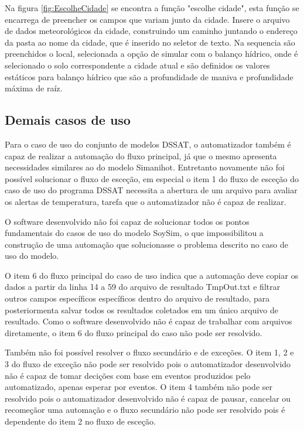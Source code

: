 \documentclass[tg]{mdtufsm}
\begin{document}
                    Na figura \ref{fig:EscolheCidade} se encontra a função "escolhe cidade", esta função se encarrega de preencher os campos que variam junto da cidade. Insere o arquivo de dados meteorológicos da cidade, construindo um caminho juntando o endereço da pasta ao nome da cidade, que é inserido no seletor de texto. Na sequencia são preenchidos o local, selecionada a opção de simular com o balanço hídrico, onde é selecionado o solo correspondente a cidade atual e são definidos os valores estáticos para balanço hídrico que são a profundidade de maniva e profundidade máxima de raíz.

                \subsection{Demais casos de uso}

                    Para o caso de uso do conjunto de modelos DSSAT, o automatizador também é capaz de realizar a automação do fluxo principal, já que o mesmo apresenta necessidades similares ao do modelo Simanihot. Entretanto novamente não foi possível solucionar o fluxo de esceção, em especial o item 1 do fluxo de esceção do caso de uso do programa DSSAT necessita a abertura de um arquivo para avaliar os alertas de temperatura, tarefa que o automatizador não é capaz de realizar.

                    O software desenvolvido não foi capaz de solucionar todos os pontos fundamentais do casos de uso do modelo SoySim, o que impossibilitou a construção de uma automação que solucionasse o problema descrito no caso de uso do modelo.

                    O item 6 do fluxo principal do caso de uso indica que a automação deve copiar os dados a partir da linha 14 a 59 do arquivo de resultado TmpOut.txt e filtrar outros campos específicos específicos dentro do arquivo de resultado, para posteriormenta salvar todos os resultados coletados em um único arquivo de resultado. Como o software desenvolvido não é capaz de trabalhar com arquivos diretamente, o item 6 do fluxo principal do caso não pode ser resolvido.

                    Também não foi possível resolver o fluxo secundário e de exceções. O item 1, 2 e 3 do fluxo de exceção não pode ser resolvido pois o automatizador desenvolvido não é capaz de tomar decições com base em eventos produzidos pelo automatizado, apenas esperar por eventos. O item 4 também não pode ser resolvido pois o automatizador desenvolvido não é capaz de pausar, cancelar ou recomeçãor uma automação e o fluxo secundário não pode ser resolvido pois é dependente do item 2 no fluxo de esceção.
\end{document}

